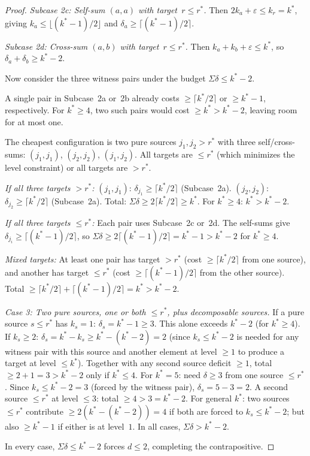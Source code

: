 \documentclass[11pt]{amsart}
\theoremstyle{definition}
\theoremstyle{remark}
\begin{document}
\begin{proof}
\emph{Subcase 2c: Self-sum $(a, a)$ with target~$r \le r^*$.}
Then $2k_a + \varepsilon \le k_r = k^*$, giving $k_a \le \lfloor(k^* - 1)/2\rfloor$
and $\delta_a \ge \lceil(k^* - 1)/2\rceil$.

\emph{Subcase 2d: Cross-sum $(a, b)$ with target~$r \le r^*$.}
Then $k_a + k_b + \varepsilon \le k^*$, so $\delta_a + \delta_b \ge k^* - 2$.

\medskip
Now consider the three witness pairs under the budget $\Sigma\delta \le k^* - 2$.

A single pair in Subcase~2a or~2b already costs $\ge \lceil k^*/2\rceil$
or $\ge k^* - 1$, respectively.  For $k^* \ge 4$, two such pairs would
cost $\ge k^* > k^* - 2$, leaving room for at most one.

The cheapest configuration is two pure sources $j_1, j_2 > r^*$ with
three self/cross-sums: $(j_1, j_1)$, $(j_2, j_2)$, $(j_1, j_2)$.
All targets are $\le r^*$ (which minimizes the level constraint) or all
targets are $> r^*$.

\emph{If all three targets $> r^*$:}
$(j_1, j_1)$: $\delta_{j_1} \ge \lceil k^*/2 \rceil$ (Subcase~2a).
$(j_2, j_2)$: $\delta_{j_2} \ge \lceil k^*/2 \rceil$ (Subcase~2a).
Total: $\Sigma\delta \ge 2\lceil k^*/2 \rceil \ge k^*$.
For $k^* \ge 4$: $k^* > k^* - 2$.

\emph{If all three targets $\le r^*$:}
Each pair uses Subcase~2c or~2d.  The self-sums give
$\delta_{j_i} \ge \lceil(k^* - 1)/2\rceil$, so
$\Sigma\delta \ge 2\lceil(k^* - 1)/2\rceil = k^* - 1 > k^* - 2$
for $k^* \ge 4$.

\emph{Mixed targets:}
At least one pair has target $> r^*$ (cost $\ge \lceil k^*/2\rceil$
from one source), and another has target $\le r^*$ (cost
$\ge \lceil(k^* - 1)/2\rceil$ from the other source).
Total $\ge \lceil k^*/2\rceil + \lceil(k^* - 1)/2\rceil = k^* > k^* - 2$.

\medskip
\emph{Case 3: Two pure sources, one or both $\le r^*$, plus decomposable sources.}
If a pure source $s \le r^*$ has $k_s = 1$: $\delta_s = k^* - 1 \ge 3$.
This alone exceeds $k^* - 2$ (for $k^* \ge 4$).
If $k_s \ge 2$: $\delta_s = k^* - k_s \ge k^* - (k^* - 2) = 2$
(since $k_s \le k^* - 2$ is needed for any witness pair with this source
and another element at level $\ge 1$ to produce a target at level $\le k^*$).
Together with any second source deficit $\ge 1$,
total $\ge 2 + 1 = 3 > k^* - 2$ only if $k^* \le 4$.
For $k^* = 5$: need $\delta \ge 3$ from one source $\le r^*$.
Since $k_s \le k^* - 2 = 3$ (forced by the witness pair), $\delta_s = 5 - 3 = 2$.
A second source $\le r^*$ at level $\le 3$: total $\ge 4 > 3 = k^* - 2$. \checkmark
For general $k^*$: two sources $\le r^*$ contribute
$\ge 2(k^* - (k^* - 2)) = 4$ if both are forced to $k_s \le k^* - 2$;
but also $\ge k^* - 1$ if either is at level~$1$.  In all cases,
$\Sigma\delta > k^* - 2$.

\medskip
In every case, $\Sigma\delta \le k^* - 2$ forces $d \le 2$, completing
the contrapositive.
\end{proof}
\end{document}
